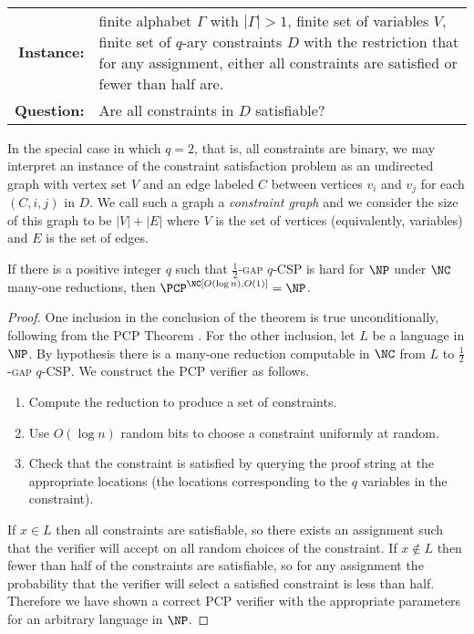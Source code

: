 \begin{definition}
  \mbox{} \\
  \begin{tabular}{r p{9.5cm}}
    \textbf{Instance:} & finite alphabet $\Gamma$ with $|\Gamma| > 1$, finite set of variables $V$, finite set of $q$-ary constraints $D$ with the restriction that for any assignment, either all constraints are satisfied or fewer than half are. \\
    \textbf{Question:} & Are all constraints in $D$ satisfiable?
  \end{tabular}
\end{definition}

In the special case in which $q = 2$, that is, all constraints are binary, we may interpret an instance of the constraint satisfaction problem as an undirected graph with vertex set $V$ and an edge labeled $C$ between vertices $v_i$ and $v_j$ for each $(C, i, j)$ in $D$.
We call such a graph a \emph{constraint graph} and we consider the size of this graph to be $|V| + |E|$ where $V$ is the set of vertices (equivalently, variables) and $E$ is the set of edges.

\begin{lemma}\label{lem:inapprox}
  If there is a positive integer $q$ such that \textsc{$\frac{1}{2}$-gap $q$-CSP} is hard for $\NP$ under $\NC$ many-one reductions, then $\PCP^\NC[O(\log n), O(1)] = \NP$.
\end{lemma}
\begin{proof}
  One inclusion in the conclusion of the theorem is true unconditionally, following from the PCP Theorem \autocite{almss92}.
  For the other inclusion, let $L$ be a language in $\NP$.
  By hypothesis there is a many-one reduction computable in $\NC$ from $L$ to \textsc{$\frac{1}{2}$-gap $q$-CSP}.
  We construct the PCP verifier as follows.
  \begin{enumerate}
  \item Compute the reduction to produce a set of constraints.
  \item Use $O(\log n)$ random bits to choose a constraint uniformly at random.
  \item Check that the constraint is satisfied by querying the proof string at the appropriate locations (the locations corresponding to the $q$ variables in the constraint).
  \end{enumerate}

  If $x \in L$ then all constraints are satisfiable, so there exists an assignment such that the verifier will accept on all random choices of the constraint.
  If $x \notin L$ then fewer than half of the constraints are satisfiable, so for any assignment the probability that the verifier will select a satisfied constraint is less than half.
  Therefore we have shown a correct PCP verifier with the appropriate parameters for an arbitrary language in $\NP$.
\end{proof}

